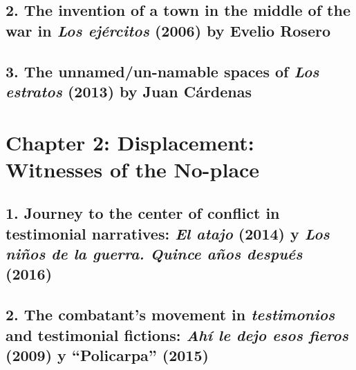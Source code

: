 \documentclass[
  11pt,
,
onecolumn,
openany
]{book}
\begin{document}
\hypertarget{the-invention-of-a-town-in-the-middle-of-the-war-in-los-ejuxe9rcitos-2006-by-evelio-rosero}{%
\subsection{\texorpdfstring{2. The invention of a town in the middle of the
war in \emph{Los ejércitos} (2006) by Evelio
Rosero}{2. The invention of a town in the middle of the war in Los ejércitos (2006) by Evelio Rosero}}\label{the-invention-of-a-town-in-the-middle-of-the-war-in-los-ejuxe9rcitos-2006-by-evelio-rosero}}

\hypertarget{the-unnamedun-namable-spaces-of-los-estratos-2013-by-juan-cuxe1rdenas}{%
\subsection{\texorpdfstring{3. The unnamed/un-namable spaces of \emph{Los
estratos} (2013) by Juan
Cárdenas~}{3. The unnamed/un-namable spaces of Los estratos (2013) by Juan Cárdenas~}}\label{the-unnamedun-namable-spaces-of-los-estratos-2013-by-juan-cuxe1rdenas}}

\hypertarget{chapter-2-displacement-witnesses-of-the-no-place}{%
\section{\texorpdfstring{\textbf{Chapter 2: Displacement: Witnesses of the
No-place}}{Chapter 2: Displacement: Witnesses of the No-place}}\label{chapter-2-displacement-witnesses-of-the-no-place}}

\hypertarget{journey-to-the-center-of-conflict-in-testimonial-narratives-el-atajo-2014-y-los-niuxf1os-de-la-guerra.-quince-auxf1os-despuuxe9s-2016}{%
\subsection{\texorpdfstring{1. Journey to the center of conflict in
testimonial narratives: \emph{El atajo} (2014) y \emph{Los niños de la guerra.
Quince años después}
(2016)~}{1. Journey to the center of conflict in testimonial narratives: El atajo (2014) y Los niños de la guerra. Quince años después (2016)~}}\label{journey-to-the-center-of-conflict-in-testimonial-narratives-el-atajo-2014-y-los-niuxf1os-de-la-guerra.-quince-auxf1os-despuuxe9s-2016}}

\hypertarget{the-combatants-movement-in-testimonios-and-testimonial-fictions-ahuxed-le-dejo-esos-fieros-2009-y-policarpa-2015}{%
\subsection{\texorpdfstring{2. The combatant's movement in \emph{testimonios}
and testimonial fictions: \emph{Ahí le dejo esos fieros} (2009) y
``Policarpa''
(2015)}{2. The combatant's movement in testimonios and testimonial fictions: Ahí le dejo esos fieros (2009) y ``Policarpa'' (2015)}}\label{the-combatants-movement-in-testimonios-and-testimonial-fictions-ahuxed-le-dejo-esos-fieros-2009-y-policarpa-2015}}
\end{document}
